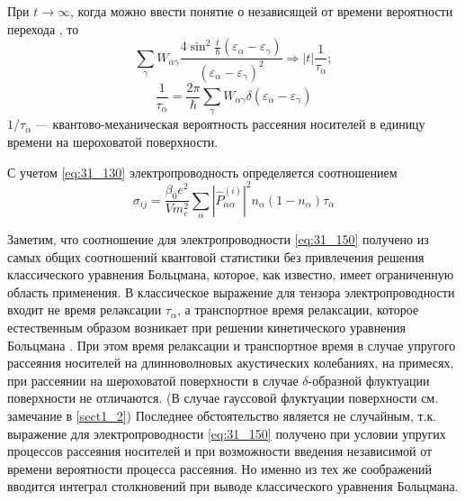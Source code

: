 При $t\to \infty $, когда можно ввести понятие о независящей от времени вероятности перехода \cite{LandauT3}, то
\begin{equation} \label{eq:31_130}
\sum_{\gamma }{W_{\alpha \gamma }\frac{4 \sin^2 \frac{t}{\hbar}\left({\varepsilon }_{\alpha }-{\varepsilon }_{\gamma }\right)}{(\varepsilon_{\alpha } - \varepsilon_{\gamma })^2}}\Rightarrow \left|t\right|\frac{1}{{\tau }_{\alpha }};
\end{equation}
\begin{equation} \label{eq:31_140}
\frac{1}{\tau_{\alpha}}=\frac{2\pi}{\hbar} \sum_{\gamma }{W_{\alpha \gamma }\delta \left(\varepsilon_{\alpha} - \varepsilon_{\gamma}\right)}
\end{equation}
${1}/{\tau_{\alpha}}$ --- квантово-механическая вероятность рассеяния носителей в единицу времени на шероховатой поверхности.

С учетом \eqref{eq:31_130} электропроводность определяется соотношением
\begin{equation} \label{eq:31_150}
{\sigma }_{ij}=\frac{{\beta }_0e^2}{Vm^2_e}\sum_{\alpha }{{\left|{\hat{P}}^{(i)}_{\alpha \alpha }\right|}^2n_{\alpha }\left(1-n_{\alpha }\right)}{\tau }_{\alpha }
\end{equation}

Заметим, что соотношение для электропроводности \eqref{eq:31_150} получено из самых общих соотношений квантовой статистики без привлечения решения классического уравнения Больцмана, которое, как известно, имеет ограниченную область применения. В классическое выражение для тензора электропроводности входит не время релаксации ${\tau }_{\alpha }$, а транспортное время релаксации, которое естественным образом возникает при решении кинетического уравнения Больцмана \cite{Anselm1978}. При этом время релаксации и транспортное время в случае упругого рассеяния носителей на длинноволновых акустических колебаниях, на примесях, при рассеянии на шероховатой поверхности в случае $\delta $-образной флуктуации поверхности не отличаются. (В случае гауссовой флуктуации поверхности см. замечание в \ref{sect1_2}) Последнее обстоятельство является не случайным, т.к. выражение для электропроводности \eqref{eq:31_150} получено при условии упругих процессов рассеяния носителей и при возможности введения независимой от времени вероятности процесса рассеяния. Но именно из тех же соображений вводится интеграл столкновений при выводе классического уравнения Больцмана.

